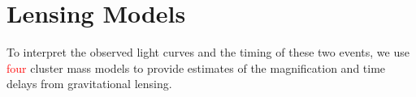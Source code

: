 \section{Lensing Models}\label{sec:LensingModels}

To interpret the observed light curves and the timing of these two events, we use \textcolor{red}{four} cluster mass models to provide estimates of the magnification and time delays from gravitational lensing. 
  